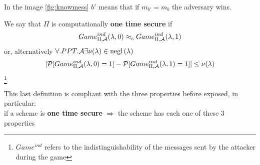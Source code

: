 In the image \ref{fig:knowmess} $b'$ means that if $m_{b'}=m_{b}$ the
adversary wins.
\begin{definition}
    We say that $\Pi$ is computationally \textbf{one time secure }  if 
    \[
        Game_{\Pi, \mathcal{A}}^{ind}(\lambda, 0) \approx_{c} Game_{\Pi, \mathcal{A}}
        ^{ind}(\lambda,1)
    \]  
    or, alternatively $ \forall.PPT.\mathcal{A} \exists \nu(\lambda) \in \mathrm{negl}\left({\lambda}\right)$
    \[
        | \mathcal{P} [ Game_{\Pi, \mathcal{A}}^{ind}(\lambda, 0)=1 ] - \mathcal{P} [ Game_{\Pi,
        \mathcal{A}}^{ind}(\lambda, 1)=1 ]   |   \leq  \nu(\lambda) 
    \]\footnote{$Game^{ind}$ refers to the indistinguishability of the messages
sent by the attacker during the game}
\end{definition}



This last definition is compliant with the three properties before exposed, in
particular:\\

if a scheme is \textbf{one time secure} $\Rightarrow$ the scheme has
each one of these 3 properties

